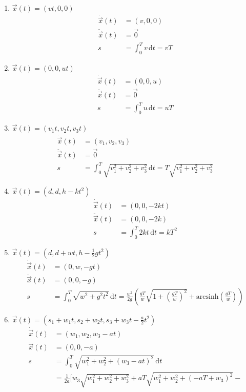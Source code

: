 \documentclass[11pt,answers]{exam}
\begin{document}
\begin{questions}
{\begin{enumerate}
\end{enumerate}}
\begin{solution}
\begin{enumerate}
\item $\vec{x}(t)=(vt,0,0)$
\begin{align*}
\dot{\vec{x}}(t)&=(v,0,0)
\\
\ddot{\vec{x}}(t)&=\vec{0}
\\
s&=\int_0^Tv\,\mathrm dt=vT
\end{align*}
\item $\vec{x}(t)=(0,0,ut)$
\begin{align*}
\dot{\vec{x}}(t)&=(0,0,u)
\\
\ddot{\vec{x}}(t)&=\vec{0}
\\
s&=\int_0^Tu\,\mathrm dt=uT
\end{align*}
\item $\vec{x}(t)=(v_1t,v_2t,v_3t)$
\begin{align*}
\dot{\vec{x}}(t)&=(v_1,v_2,v_3)
\\
\ddot{\vec{x}}(t)&=\vec{0}
\\
s&=\int_0^T\sqrt{v_1^2+v_2^2+v_3^2}\,\mathrm dt=T\sqrt{v_1^2+v_2^2+v_3^2}
\end{align*}
\item $\vec{x}(t)=(d,d,h-kt^2)$
\begin{align*}
\dot{\vec{x}}(t)&=(0,0,-2kt)
\\
\ddot{\vec{x}}(t)&=(0,0,-2k)
\\
s&=\int_0^T2kt\,\mathrm dt=kT^2
\end{align*}
\item $\vec{x}(t)=(d,d+wt,h-\frac{1}{2}gt^2)$
\begin{align*}
\dot{\vec{x}}(t)&=(0,w,-gt)
\\
\ddot{\vec{x}}(t)&=(0,0,-g)
\\
s&=\int_0^T\sqrt{w^2+g^2t^2}\,\mathrm dt=
\frac{w^2}{2g}\left(\frac{gT}{w}\sqrt{1+\left(\frac{gT}{w}\right)^2}+\text{arcsinh}\left(\frac{gT}{w}\right)\right)
\end{align*}
\item $\vec{x}(t)=(s_1+w_1t,s_2+w_2t,s_3+w_3t-\frac{a}{2}t^2)$
\begin{align*}
\dot{\vec{x}}(t)&=(w_1,w_2,w_3-at)
\\
\ddot{\vec{x}}(t)&=(0,0,-a)
\\
s&=\int_0^T\sqrt{w_1^2+w_2^2+(w_3-at)^2}\,\mathrm dt
\\
&=\frac{1}{2a}\Bigg[
w_3\sqrt{w_1^2+w_2^2+w_3^2}+aT\sqrt{w_1^2+w_2^2+(-aT+w_3)^2}-

\end{align*}
\end{enumerate}
\end{solution}
\end{questions}
\end{document}
